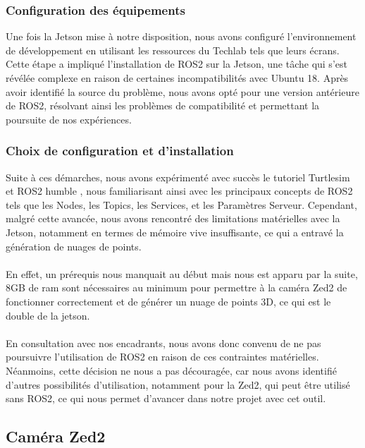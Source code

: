     \subsubsection{Configuration des équipements}
        \normalsize{
            Une fois la Jetson mise à notre disposition, nous avons configuré l'environnement de développement en utilisant les ressources du Techlab tels que leurs écrans. Cette étape a impliqué l'installation de ROS2 sur la Jetson, une tâche qui s'est révélée complexe en raison de certaines incompatibilités avec Ubuntu 18. Après avoir identifié la source du problème, nous avons opté pour une version antérieure de ROS2, résolvant ainsi les problèmes de compatibilité et permettant la poursuite de nos expériences.
        }
    
    \subsubsection{Choix de configuration et d'installation}
        \normalsize{
            Suite à ces démarches, nous avons expérimenté avec succès le tutoriel Turtlesim et ROS2 humble \cite{turtle_sim_ros2}, nous familiarisant ainsi avec les principaux concepts de ROS2 tels que les Nodes, les Topics, les Services, et les Paramètres Serveur. Cependant, malgré cette avancée, nous avons rencontré des limitations matérielles avec la Jetson, notamment en termes de mémoire vive insuffisante, ce qui a entravé la génération de nuages de points.
        }
        \\ \\
        \normalsize{
            En effet, un prérequis nous manquait au début mais nous est apparu par la suite, 8GB de ram sont nécessaires au minimum pour permettre à la caméra Zed2 de fonctionner correctement et de générer un nuage de points 3D, ce qui est le double de la jetson.
        }
        \\ \\
        \normalsize{
            En consultation avec nos encadrants, nous avons donc convenu de ne pas poursuivre l'utilisation de ROS2 en raison de ces contraintes matérielles. Néanmoins, cette décision ne nous a pas découragée, car nous avons identifié d'autres possibilités d'utilisation, notamment pour la Zed2, qui peut être utilisé sans ROS2, ce qui nous permet d'avancer dans notre projet avec cet outil.
        }

\subsection{Caméra Zed2}


